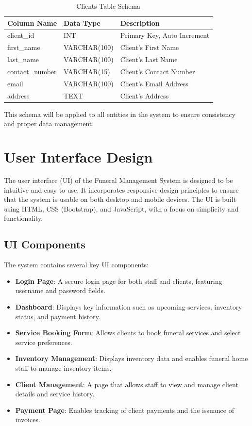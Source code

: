 \documentclass[a4paper,12pt]{report}
\begin{document}
\begin{table}[ht]
\centering
\begin{tabular}{|l|l|l|}
\hline
\textbf{Column Name} & \textbf{Data Type} & \textbf{Description} \\ \hline
client\_id & INT & Primary Key, Auto Increment \\ \hline
first\_name & VARCHAR(100) & Client’s First Name \\ \hline
last\_name & VARCHAR(100) & Client’s Last Name \\ \hline
contact\_number & VARCHAR(15) & Client’s Contact Number \\ \hline
email & VARCHAR(100) & Client’s Email Address \\ \hline
address & TEXT & Client’s Address \\ \hline
\end{tabular}
\caption{Clients Table Schema}
\label{tab:clients_schema}
\end{table}

This schema will be applied to all entities in the system to ensure consistency and proper data management.

\section{User Interface Design}
The user interface (UI) of the Funeral Management System is designed to be intuitive and easy to use. It incorporates responsive design principles to ensure that the system is usable on both desktop and mobile devices. The UI is built using HTML, CSS (Bootstrap), and JavaScript, with a focus on simplicity and functionality.

\subsection{UI Components}
The system contains several key UI components:

\begin{itemize}
    \item \textbf{Login Page}: A secure login page for both staff and clients, featuring username and password fields.
    \item \textbf{Dashboard}: Displays key information such as upcoming services, inventory status, and payment history.
    \item \textbf{Service Booking Form}: Allows clients to book funeral services and select service preferences.
    \item \textbf{Inventory Management}: Displays inventory data and enables funeral home staff to manage inventory items.
    \item \textbf{Client Management}: A page that allows staff to view and manage client details and service history.
    \item \textbf{Payment Page}: Enables tracking of client payments and the issuance of invoices.
\end{itemize}
\end{document}
